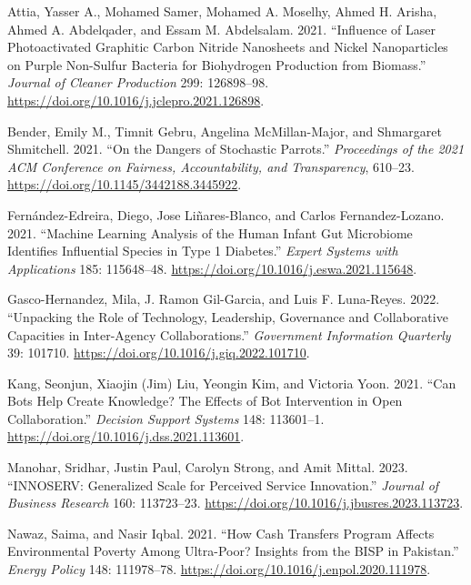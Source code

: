 \documentclass[
  12pt,
]{article}
\newlength{\cslhangindent}
\newenvironment{CSLReferences}[2] %
 {\begin{list}{}{%
  \setlength{\itemindent}{0pt}
  \setlength{\leftmargin}{0pt}
  \setlength{\parsep}{0pt}
  \ifodd #1
   \setlength{\leftmargin}{\cslhangindent}
   \setlength{\itemindent}{-1\cslhangindent}
  \fi
  \setlength{\itemsep}{#2\baselineskip}}}
 {\end{list}}
\begin{document}
\begin{CSLReferences}{1}{0}
Attia, Yasser A., Mohamed Samer, Mohamed A. Moselhy, Ahmed H. Arisha,
Ahmed A. Abdelqader, and Essam M. Abdelsalam. 2021. {``Influence of
Laser Photoactivated Graphitic Carbon Nitride Nanosheets and Nickel
Nanoparticles on Purple Non-Sulfur Bacteria for Biohydrogen Production
from Biomass.''} \emph{Journal of Cleaner Production} 299: 126898--98.
\url{https://doi.org/10.1016/j.jclepro.2021.126898}.

Bender, Emily M., Timnit Gebru, Angelina McMillan-Major, and Shmargaret
Shmitchell. 2021. {``On the Dangers of Stochastic Parrots.''}
\emph{Proceedings of the 2021 ACM Conference on Fairness,
Accountability, and Transparency}, 610--23.
\url{https://doi.org/10.1145/3442188.3445922}.

Fernández-Edreira, Diego, Jose Liñares-Blanco, and Carlos
Fernandez-Lozano. 2021. {``Machine Learning Analysis of the Human Infant
Gut Microbiome Identifies Influential Species in Type 1 Diabetes.''}
\emph{Expert Systems with Applications} 185: 115648--48.
\url{https://doi.org/10.1016/j.eswa.2021.115648}.

Gasco-Hernandez, Mila, J. Ramon Gil-Garcia, and Luis F. Luna-Reyes.
2022. {``Unpacking the Role of Technology, Leadership, Governance and
Collaborative Capacities in Inter-Agency Collaborations.''}
\emph{Government Information Quarterly} 39: 101710.
\url{https://doi.org/10.1016/j.giq.2022.101710}.

Kang, Seonjun, Xiaojin (Jim) Liu, Yeongin Kim, and Victoria Yoon. 2021.
{``Can Bots Help Create Knowledge? The Effects of Bot Intervention in
Open Collaboration.''} \emph{Decision Support Systems} 148: 113601--1.
\url{https://doi.org/10.1016/j.dss.2021.113601}.

Manohar, Sridhar, Justin Paul, Carolyn Strong, and Amit Mittal. 2023.
{``INNOSERV: Generalized Scale for Perceived Service Innovation.''}
\emph{Journal of Business Research} 160: 113723--23.
\url{https://doi.org/10.1016/j.jbusres.2023.113723}.

Nawaz, Saima, and Nasir Iqbal. 2021. {``How Cash Transfers Program
Affects Environmental Poverty Among Ultra-Poor? Insights from the BISP
in Pakistan.''} \emph{Energy Policy} 148: 111978--78.
\url{https://doi.org/10.1016/j.enpol.2020.111978}.


\end{CSLReferences}
\end{document}
